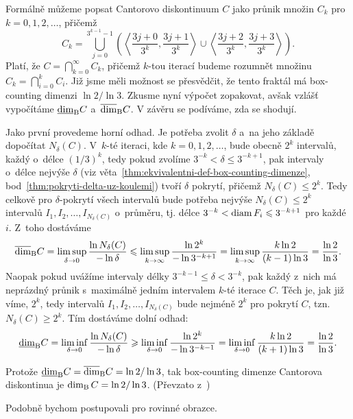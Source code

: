 \begin{example}\label{ex:cantorovo-diskontinuum}
    Formálně můžeme popsat Cantorovo diskontinuum $C$ jako průnik množin $C_k$ pro $k=0,1,2,\ldots$, přičemž
    \[C_k=\bigcup _{j=0}^{3^{k-1}-1}\left(\left\langle{\frac {3j+0}{3^{k}}},{\frac {3j+1}{3^{k}}}\right\rangle\cup \left\langle{\frac {3j+2}{3^{k}}},{\frac {3j+3}{3^{k}}}\right\rangle\right).\]
    Platí, že $C=\bigcap_{k=0}^\infty C_k$, přičemž $k$-tou iterací budeme rozumnět množinu $C_k=\bigcap_{i=0}^k C_i$. Již jsme měli možnost se přesvědčit, že tento fraktál má box-counting dimenzi $\ln{2}/\ln{3}$. Zkusme nyní výpočet zopakovat, avšak vzlášť vypočítáme $\underline{\dim}_\textup{B}{C}$ a~$\overline{\dim}_\textup{B}{C}$. V závěru se podíváme, zda se shodují.

    Jako první provedeme horní odhad. Je potřeba zvolit $\delta$ a~na jeho základě dopočítat $N_\delta(C)$. V~$k$-té iteraci, kde $k=0,1,2,\ldots$, bude obecně $2^k$ intervalů, každý o~délce $(1/3)^k$, tedy pokud zvolíme $3^{-k}<\delta\leqslant 3^{-k+1}$, pak intervaly o~délce nejvýše $\delta$ (viz věta~\ref{thm:ekvivalentni-def-box-counting-dimenze}, bod~\ref{thm:pokryti-delta-uz-koulemi}) tvoří $\delta$ pokrytí, přičemž $N_\delta(C)\leqslant 2^k$. Tedy celkově pro $\delta$-pokrytí všech intervalů bude potřeba nejvýše $N_\delta(C)\leqslant 2^k$ intervalů $I_1,I_2,\ldots,I_{N_\delta(C)}$ o~průměru, tj. délce $3^{-k}<\operatorname{diam}{F_i}\leqslant 3^{-k+1}$ pro každé $i$. Z~toho dostáváme
    \[\overline{\dim}_\textup{B}{C}=\limsup_{\delta\to 0}\dfrac{\ln{N_\delta(C)}}{-\ln{\delta}}\leqslant\limsup_{k\to\infty}\dfrac{\ln{2^k}}{-\ln{3^{-k+1}}}=\limsup_{k\to\infty}\dfrac{k\ln{2}}{(k-1)\ln{3}}=\dfrac{\ln{2}}{\ln{3}}.\]
    Naopak pokud uvážíme intervaly délky $3^{-k-1}\leqslant\delta<3^{-k}$, pak každý z~nich má neprázdný průnik s~maximálně jedním intervalem $k$-té iterace $C$. Těch je, jak již víme, $2^k$, tedy intervalů $I_1,I_2,\ldots,I_{N_\delta(C)}$ bude nejméně $2^k$ pro pokrytí $C$, tzn. $N_\delta(C)\geqslant 2^k$. Tím dostáváme dolní odhad:
    \[\underline{\dim}_\textup{B}{C}=\liminf_{\delta\to 0}\dfrac{\ln{N_\delta(C)}}{-\ln{\delta}}\geqslant\liminf_{\delta\to 0}\dfrac{\ln{2^k}}{-\ln{3^{-k-1}}}=\liminf_{\delta\to 0}\dfrac{k\ln{2}}{(k+1)\ln{3}}=\dfrac{\ln{2}}{\ln{3}}.\]

    Protože $\underline{\dim}_\textup{B}{C}=\overline{\dim}_\textup{B}{C}=\ln{2}/\ln{3}$, tak box-counting dimenze Cantorova diskontinua je $\operatorname{dim_B}{C}=\ln{2}/\ln{3}$. (Převzato z~\citep[str. 32]{Falconer2014})
\end{example}
Podobně bychom postupovali pro rovinné obrazce.
